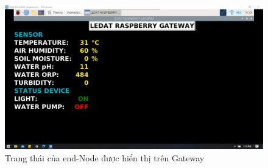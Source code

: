 \begin{figure}[H]
	\centering
	\includegraphics[scale=0.3]{Chapter 4/image chapter 4/Relay1ON-Relay2OFF.png}
	\caption[Trang thái của end-Node được hiển thị trên Gateway]{Trang thái của end-Node được hiển thị trên Gateway}
	\label{hinh47}
\end{figure}

